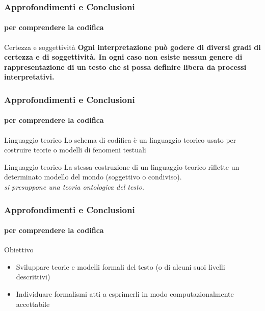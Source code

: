 \begin{frame}
	\frametitle{Approfondimenti e Conclusioni}
	\framesubtitle{per comprendere la codifica}
	\addtocounter{nframe}{1}

	\begin{block}{Certezza e soggettività}
		\textbf{Ogni interpretazione può godere di diversi gradi di certezza e di soggettività. In ogni caso non esiste nessun genere di rappresentazione di un testo che si possa definire libera da processi interpretativi.}
    \end{block}
   
\end{frame}

\begin{frame}
	\frametitle{Approfondimenti e Conclusioni}
	\framesubtitle{per comprendere la codifica}
	\addtocounter{nframe}{1}

	\begin{block}{Linguaggio teorico}
		Lo schema di codifica è un linguaggio teorico usato per costruire teorie o modelli di fenomeni testuali
    \end{block}

    \begin{block}{Linguaggio teorico}
        La stessa costruzione di un linguaggio teorico riflette un determinato modello del mondo (soggettivo o condiviso).
        \\ \textit{si presuppone una teoria ontologica del testo}.
    \end{block}
   
\end{frame}

\begin{frame}
	\frametitle{Approfondimenti e Conclusioni}
	\framesubtitle{per comprendere la codifica}
	\addtocounter{nframe}{1}

	\begin{block}{Obiettivo}
		\begin{itemize}
			\item Sviluppare teorie e modelli formali del testo (o di alcuni suoi livelli descrittivi)
			\item Individuare formalismi atti a esprimerli in modo computazionalmente accettabile
		\end{itemize}
	
    \end{block}
   
\end{frame}



